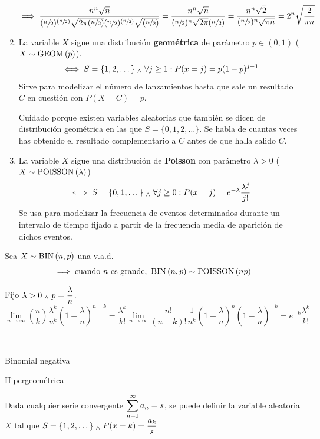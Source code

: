\begin{ejem}
\begin{enumerate}
		      \[\implies \frac{n^n\sqrt{n}}{(\sfrac{n}{2})^{(\sfrac{n}{2})}\sqrt{2\pi (\sfrac{n}{2})}(\sfrac{n}{2})^{(\sfrac{n}       {2})}\sqrt{(\sfrac{n}{2})}} =
			      \frac{n^n\sqrt{n}}
			      {(\sfrac{n}{2})^{n}\sqrt{2\pi}(\sfrac{n}        {2})}=\frac{n^n\sqrt{2}}{(\sfrac{n}{2})^n\sqrt{\pi      n}}=2^n\sqrt{\frac{2}{\pi n}}\]
		\item La variable $X$ sigue una distribución \textbf{geométrica} de parámetro
		      $p\in(0,1)$ ($X\sim\operatorname{GEOM}\left(p\right)$).
		      \[\iff S=\{1, 2, \dots\} \; _{\wedge} \; \forall j \geq 1 : P(x=j)=p(1-p)^{j-1}\]
		      Sirve para modelizar el número de lanzamientos hasta que sale un resultado $C$
		      en cuestión con $P(X=C)=p$. \vspace{-0.3cm}
		      \begin{obs}
			      Cuidado porque existen variables aleatorias que también se dicen de distribución geométrica en las que $S=\{0, 1, 2, \dots\}$. Se habla de cuantas veces has obtenido el resultado complementario a $C$ antes de que halla salido $C$.
		      \end{obs}
		\item La variable $X$ sigue una distribución de \textbf{Poisson} con parámetro
		      $\lambda>0$ ($X\sim \operatorname{POISSON}\left(\lambda\right)$)
		      \[\iff S=\{0, 1, \dots\} \; _{\wedge} \; \forall j \geq 0 : P(x=j)=e^{-\lambda}\frac{\lambda^j}{j!}\]
		      Se usa para modelizar la frecuencia de eventos determinados durante un
		      intervalo de tiempo fijado a partir de la frecuencia media de aparición de
		      dichos eventos.
	\end{enumerate}
\end{ejem}

\begin{prop}
	Sea $X\sim \operatorname{BIN}\left(n, p\right)$ una v.a.d.
	\[\implies \text{cuando $n$ es grande, }\operatorname{BIN}\left(n, p\right)\sim\operatorname{POISSON}\left(np\right)\]
	\begin{dem}
		Fijo $\displaystyle\lambda>0 \; _{\wedge} \; p=\frac{\lambda}{n}$.
		\[\lim_{n\rightarrow\infty} \binom{n}{k}\frac{\lambda^k}{n^k}\left(1-\frac{\lambda}{n}\right)^{n-k}=\frac{\lambda^k}{k!}\lim_{n\rightarrow\infty} \frac{n!}{(n-k)!}\frac{1}{n^k}\left(1-\frac{\lambda}{n}\right)^n\left(1-\frac{\lambda}{n}\right)^{-k}=e^{-k}\frac{\lambda^k}{k!}\]

	\end{dem}
\end{prop}

\begin{ejem} \mbox{} \\
	\begin{itemize*}[itemjoin=\hspace{1cm}]
		\item Binomial negativa
		\item Hipergeométrica \\
		\item Dada cualquier serie convergente $\displaystyle \sum_{n=1}^\infty a_n = s$, se puede
		      definir la variable aleatoria $X$ tal que $\displaystyle S=\{1, 2, \dots\} \; _{\wedge} \;
			      P(x=k)=\frac{a_k}{s}$
	\end{itemize*}
\end{ejem}

